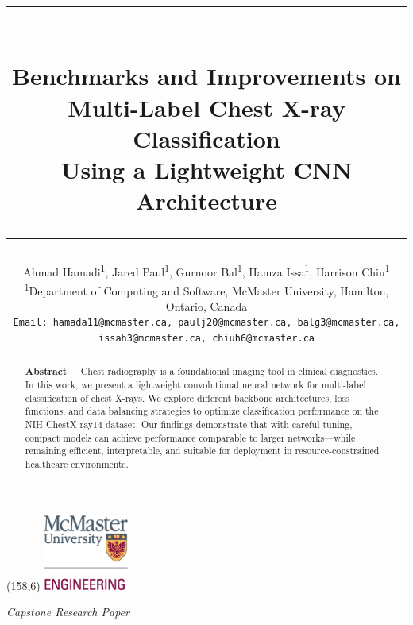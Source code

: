 \documentclass[12pt]{article}
\title{
\vspace{-2em}
\rule{\textwidth}{0.4pt} \\[0.5em]
\textbf{\LARGE Benchmarks and Improvements on\\ Multi-Label Chest X-ray Classification\\ Using a Lightweight CNN Architecture} \\
\rule{\textwidth}{0.4pt}
}
\author{
Ahmad Hamadi\textsuperscript{1}, Jared Paul\textsuperscript{1}, Gurnoor Bal\textsuperscript{1}, Hamza Issa\textsuperscript{1}, Harrison Chiu\textsuperscript{1} \\
\textsuperscript{1}Department of Computing and Software, McMaster University, Hamilton, Ontario, Canada \\
\texttt{Email: hamada11@mcmaster.ca, paulj20@mcmaster.ca, balg3@mcmaster.ca, issah3@mcmaster.ca, chiuh6@mcmaster.ca}
}
\date{}
\begin{document}
\begin{textblock}{40}(158,6)
    \includegraphics[width=2.8cm]{McMaster_Faculty_of_Engineering_logo.png}
\end{textblock}

\maketitle

\vspace{-1em}
\noindent\textit{Capstone Research Paper}

\vspace{1em}

\begin{abstract}
\noindent
\textbf{Abstract—} Chest radiography is a foundational imaging tool in clinical diagnostics. In this work, we present a lightweight convolutional neural network for multi-label classification of chest X-rays. We explore different backbone architectures, loss functions, and data balancing strategies to optimize classification performance on the NIH ChestX-ray14 dataset. Our findings demonstrate that with careful tuning, compact models can achieve performance comparable to larger networks—while remaining efficient, interpretable, and suitable for deployment in resource-constrained healthcare environments.
\end{abstract}

\vspace{1em}
\end{document}
